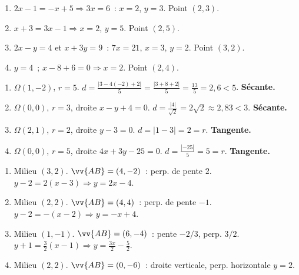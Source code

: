 \begin{enumerate}
  \item $2x-1=-x+5\Rightarrow3x=6$~: $x=2$, $y=3$. Point $(2,3)$.
  \item $x+3=3x-1\Rightarrow x=2$, $y=5$. Point $(2,5)$.
  \item $2x-y=4$ et $x+3y=9$~: $7x=21$, $x=3$, $y=2$. Point $(3,2)$.
  \item $y=4$~; $x-8+6=0\Rightarrow x=2$. Point $(2,4)$.
\end{enumerate}


\begin{enumerate}
  \item $\Omega(1,-2)$, $r=5$. $d=\frac{|3-4(-2)+2|}{5}=\frac{|3+8+2|}{5}=\frac{13}{5}=2{,}6<5$.
        \textbf{S\'ecante.}
  \item $\Omega(0,0)$, $r=3$, droite $x-y+4=0$.
        $d=\frac{|4|}{\sqrt{2}}=2\sqrt{2}\approx2{,}83<3$. \textbf{S\'ecante.}
  \item $\Omega(2,1)$, $r=2$, droite $y-3=0$.
        $d=|1-3|=2=r$. \textbf{Tangente.}
  \item $\Omega(0,0)$, $r=5$, droite $4x+3y-25=0$.
        $d=\frac{|{-25}|}{5}=5=r$. \textbf{Tangente.}
\end{enumerate}


\begin{enumerate}
  \item Milieu $(3,2)$. $\vv{AB}=(4,-2)$~: perp. de pente $2$.
        $y-2=2(x-3)\Rightarrow y=2x-4$.
  \item Milieu $(2,2)$. $\vv{AB}=(4,4)$~: perp. de pente $-1$.
        $y-2=-(x-2)\Rightarrow y=-x+4$.
  \item Milieu $(1,-1)$. $\vv{AB}=(6,-4)$~: pente $-2/3$, perp. $3/2$.
        $y+1=\frac{3}{2}(x-1)\Rightarrow y=\frac{3x}{2}-\frac{5}{2}$.
  \item Milieu $(2,2)$. $\vv{AB}=(0,-6)$~: droite verticale, perp. horizontale $y=2$.
\end{enumerate}


